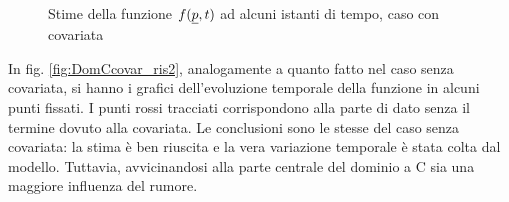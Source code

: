 \documentclass[a4paper,11pt,twoside,openright]{book}							%
\begin{document}
\begin{figure}[H]
{   }
\caption{Stime della funzione $f(\protect\underline{p},t)$ ad alcuni istanti di tempo, caso con covariata}
\label{fig:DomCcovar_ris}
\end{figure}

In fig. \ref{fig:DomCcovar_ris2}, analogamente a quanto fatto nel caso senza covariata, si hanno i grafici dell'evoluzione temporale della funzione in alcuni punti fissati. I punti rossi tracciati corrispondono alla parte di dato senza il termine dovuto alla covariata. Le conclusioni sono le stesse del caso senza covariata: la stima è ben riuscita e la vera variazione temporale è stata colta dal modello. Tuttavia, avvicinandosi alla parte centrale del dominio a C sia una maggiore influenza del rumore.
\end{document}
